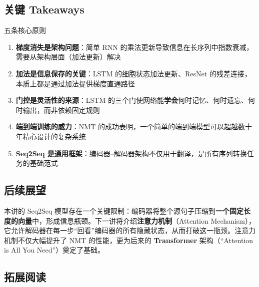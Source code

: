 \subsection{关键 Takeaways}

\begin{importantbox}{五条核心原则}
\begin{enumerate}
    \item \textbf{梯度消失是架构问题}：简单 RNN 的乘法更新导致信息在长序列中指数衰减，需要从架构层面（加法更新）解决
    \item \textbf{加法是信息保存的关键}：LSTM 的细胞状态加法更新、ResNet 的残差连接，本质上都是通过加法提供梯度直通路径
    \item \textbf{门控是灵活性的来源}：LSTM 的三个门使网络能\textbf{学会}何时记忆、何时遗忘、何时输出，而非依赖固定规则
    \item \textbf{端到端训练的威力}：NMT 的成功表明，一个简单的端到端模型可以超越数十年精心设计的复杂系统
    \item \textbf{Seq2Seq 是通用框架}：编码器--解码器架构不仅用于翻译，是所有序列转换任务的基础范式
\end{enumerate}
\end{importantbox}

\subsection{后续展望}

本讲的 Seq2Seq 模型存在一个关键限制：编码器将整个源句子压缩到\textbf{一个固定长度的向量}中，形成信息瓶颈。下一讲将介绍\textbf{注意力机制}（Attention Mechanism），它允许解码器在每一步``回看''编码器的所有隐藏状态，从而打破这一瓶颈。注意力机制不仅大幅提升了 NMT 的性能，更为后来的 \textbf{Transformer} 架构（``Attention is All You Need''）奠定了基础。

\subsection{拓展阅读}

